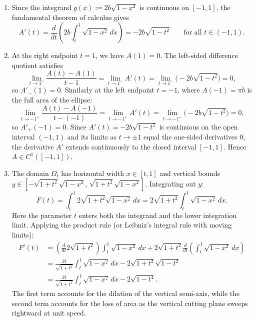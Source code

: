 \begin{exercisesolution}
\begin{enumerate}[label=\textbf{(\alph*)}]
  \item Since the integrand $g(x) := 2b\sqrt{1-x^2}$ is continuous on $[-1, 1]$, the fundamental
    theorem of calculus gives
    \[A'(t) = \frac{d}{dt}\left(2b\int_t^1 \sqrt{1-x^2}\,dx\right) = -2b\sqrt{1-t^2} \qquad \text{for all } t \in (-1, 1).\]

  \item At the right endpoint $t = 1$, we have $A(1) = 0$. The left-sided difference quotient satisfies
    \[\lim_{t \to 1^-} \frac{A(t) - A(1)}{t - 1} = \lim_{t \to 1^-} A'(t) = \lim_{t \to 1^-} \big(-2b\sqrt{1-t^2}\big) = 0,\]
    so $A'_-(1) = 0$. Similarly at the left endpoint $t = -1$, where $A(-1) = \pi b$ is the full area of the ellipse:
    \[\lim_{t \to -1^+} \frac{A(t) - A(-1)}{t - (-1)} = \lim_{t \to -1^+} A'(t) = \lim_{t \to -1^+} \big(-2b\sqrt{1-t^2}\big) = 0,\]
    so $A'_+(-1) = 0$.
    Since $A'(t) = -2b\sqrt{1-t^2}$ is continuous on the open interval $(-1, 1)$ and its limits as
    $t \to \pm 1$ equal the one-sided derivatives $0$, the derivative $A'$ extends continuously to
    the closed interval $[-1, 1]$. Hence $A \in C^1([-1, 1])$.

  \item The domain $\Omega_t$ has horizontal width $x \in [t, 1]$ and vertical bounds
    $y \in [-\sqrt{1+t^2}\sqrt{1-x^2},\, \sqrt{1+t^2}\sqrt{1-x^2}]$. Integrating out $y$:
    \[F(t) = \int_t^1 2\sqrt{1+t^2}\sqrt{1-x^2}\,dx = 2\sqrt{1+t^2} \int_t^1 \sqrt{1-x^2}\,dx.\]
    Here the parameter $t$ enters both the integrand and the lower integration limit. Applying the
    product rule (or Leibniz's integral rule with moving limits):
    \begin{align*}
      F'(t) &= \left(\frac{d}{dt} 2\sqrt{1+t^2}\right) \int_t^1 \sqrt{1-x^2}\,dx + 2\sqrt{1+t^2} \frac{d}{dt}\left(\int_t^1 \sqrt{1-x^2}\,dx\right) \\
      &= \frac{2t}{\sqrt{1+t^2}} \int_t^1 \sqrt{1-x^2}\,dx - 2\sqrt{1+t^2}\sqrt{1-t^2} \\
      &= \frac{2t}{\sqrt{1+t^2}} \int_t^1 \sqrt{1-x^2}\,dx - 2\sqrt{1-t^4}.
    \end{align*}
    The first term accounts for the dilation of the vertical semi-axis, while the second term accounts
    for the loss of area as the vertical cutting plane sweeps rightward at unit speed.
\end{enumerate}
\end{exercisesolution}


